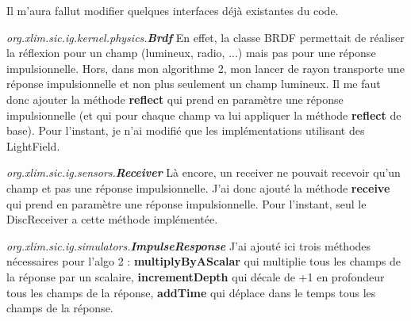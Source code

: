 Il m'aura fallut modifier quelques interfaces déjà existantes du code.\newline\par

\textit{org.xlim.sic.ig.kernel.physics.\textbf{Brdf}} \qquad
En effet, la classe BRDF permettait de réaliser la réflexion pour un champ (lumineux, radio, ...) mais pas pour une réponse impulsionnelle. Hors, dans mon algorithme 2, mon lancer de rayon transporte une réponse impulsionnelle et non plus seulement un champ lumineux. Il me faut donc ajouter la méthode \textbf{reflect} qui prend en paramètre une réponse impulsionnelle (et qui pour chaque champ va lui appliquer la méthode \textbf{reflect} de base). Pour l'instant, je n'ai modifié que les implémentations utilisant des LightField.\newline\par

\textit{org.xlim.sic.ig.sensors.\textbf{Receiver}} \qquad
Là encore, un receiver ne pouvait recevoir qu'un champ et pas une réponse impulsionnelle. J'ai donc ajouté la méthode \textbf{receive} qui prend en paramètre une réponse impulsionnelle. Pour l'instant, seul le DiscReceiver a cette méthode implémentée.\newline\par

\textit{org.xlim.sic.ig.simulators.\textbf{ImpulseResponse}} \qquad
J'ai ajouté ici trois méthodes nécessaires pour l'algo 2 : \textbf{multiplyByAScalar} qui multiplie tous les champs de la réponse par un scalaire, \textbf{incrementDepth} qui décale de +1 en profondeur tous les champs de la réponse, \textbf{addTime} qui déplace dans le temps tous les champs de la réponse.